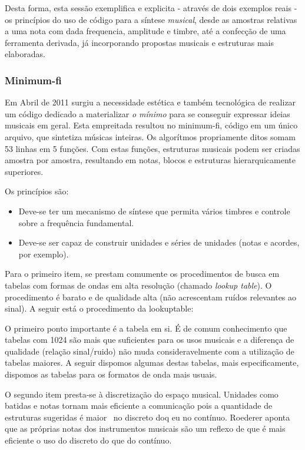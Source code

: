 Desta forma, esta sessão exemplifica e explicita - através de dois exemplos reais - os princípios do uso de código para a síntese \emph{musical}, desde as amostras
relativas a uma nota com dada frequencia, amplitude e timbre, até a confecção
de uma ferramenta derivada, já incorporando propostas musicais e estruturas
mais elaboradas.

      \subsubsection{Minimum-fi}

Em Abril de 2011 surgiu a necessidade estética e também tecnológica
de realizar um código dedicado a materializar \emph{o mínimo}
para se conseguir expressar ideias musicais em geral. Esta empreitada
resultou no minimum-fi, código em um único arquivo, que sintetiza
músicas inteiras. Os algorítmos propriamente ditos somam 
53 linhas em 5 funções. Com estas funções, estruturas musicais podem ser criadas amostra por amostra, resultando em notas, blocos e estruturas hierarquicamente superiores.

Os princípios são:
\begin{itemize}
  \item Deve-se ter um mecanismo de síntese que
permita vários timbres e controle sobre a frequência fundamental.
  \item Deve-se ser capaz de construir unidades e séries de unidades (notas e acordes, por exemplo).
\end{itemize}

Para o primeiro item, se prestam comumente os procedimentos de busca em tabelas com formas
de ondas em alta resolução (chamado \emph{lookup table}). O procedimento é barato e de qualidade alta
(não acrescentam ruídos relevantes ao sinal). A seguir está o procedimento da lookuptable:


O primeiro ponto importante é a tabela em si. É de comum conhecimento que
tabelas com 1024 são mais que suficientes para os usos musicais e a diferença
de qualidade (relação sinal/ruido) não muda consideravelmente com a utilização
de tabelas maiores. A seguir dispomos algumas destas tabelas, mais especificamente, dispomos as tabelas para os formatos de onda mais usuais. 


O segundo item presta-se à discretização do espaço musical. Unidades como batidas e notas
tornam mais eficiente a comunicação pois a quantidade
de estruturas sugeridas é maior~\cite{Roederer} no discreto doq eu no contínuo. Roederer
aponta que as próprias notas dos instrumentos musicais são um reflexo de que é mais eficiente
o uso do discreto do que do contínuo.

